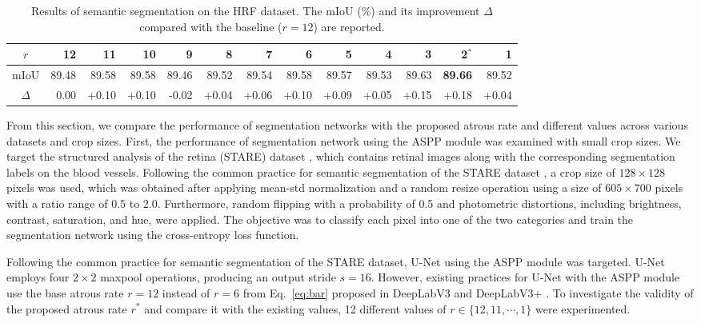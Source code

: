 \documentclass{article}
\def\eqref#1{Eq.~\ref{#1}}
\begin{document}
\begin{table}[t!]
	\caption{Results of semantic segmentation on the HRF dataset. The mIoU (\%) and its improvement $\Delta$ compared with the baseline ($r=12$) are reported.}
	\label{tab:hrf}
	\centering
    \begin{adjustbox}{width=\textwidth,center}
	\begin{tabular}{c|rrrrrrrrrrrr}
		\toprule
		$r$      & 12    & 11    & 10    & 9     & 8     & 7     & 6     & 5     & 4     & 3     & 2$^*$          & 1     \\
		\midrule
		mIoU     & 89.48 & 89.58 & 89.58 & 89.46 & 89.52 & 89.54 & 89.58 & 89.57 & 89.53 & 89.63 & \textbf{89.66} & 89.52 \\
		$\Delta$ & 0.00  & +0.10 & +0.10 & -0.02 & +0.04 & +0.06 & +0.10 & +0.09 & +0.05 & +0.15 & +0.18          & +0.04 \\
		\bottomrule
	\end{tabular}
    \end{adjustbox}
\end{table}


From this section, we compare the performance of segmentation networks with the proposed atrous rate and different values across various datasets and crop sizes. First, the performance of segmentation network using the ASPP module was examined with small crop sizes. We target the structured analysis of the retina (STARE) dataset \citep{DBLP:journals/tmi/HooverKG00,DBLP:journals/tmi/HooverG03}, which contains retinal images along with the corresponding segmentation labels on the blood vessels. Following the common practice for semantic segmentation of the STARE dataset \citep{DBLP:journals/tbe/YanYC18}, a crop size of $128 \times 128$ pixels was used, which was obtained after applying mean-std normalization and a random resize operation using a size of $605 \times 700$ pixels with a ratio range of 0.5 to 2.0. Furthermore, random flipping with a probability of 0.5 and photometric distortions, including brightness, contrast, saturation, and hue, were applied. The objective was to classify each pixel into one of the two categories and train the segmentation network using the cross-entropy loss function.

Following the common practice for semantic segmentation of the STARE dataset, U-Net \citep{DBLP:conf/miccai/RonnebergerFB15} using the ASPP module was targeted. U-Net employs four $2\times2$ maxpool operations, producing an output stride $s=16$. However, existing practices for U-Net with the ASPP module use the base atrous rate $r=12$ instead of $r=6$ from \eqref{eq:bar} proposed in DeepLabV3 and DeepLabV3+ \citep{mmseg2020}. To investigate the validity of the proposed atrous rate $r^*$ and compare it with the existing values, 12 different values of $r \in \{12, 11, \cdots, 1\}$ were experimented.
\end{document}

